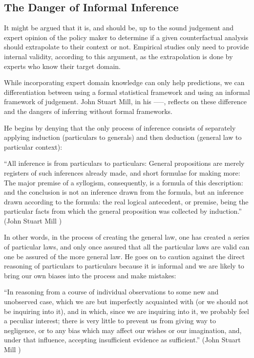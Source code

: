\documentclass[a4paper,12pt]{article}
\begin{document}
\subsection*{The Danger of Informal Inference}

It might be argued that it is, and should be, up to the sound judgement and expert opinion of the policy maker to determine if a given counterfactual analysis should extrapolate to their context or not. Empirical studies only need to provide internal validity, according to this argument, as the extrapolation is done by experts who know their target domain.

While incorporating expert domain knowledge can only help predictions, we can differentiation between using a formal statistical framework and using an informal framework of judgement. John Stuart Mill, in his -----, reflects on these difference and the dangers of inferring without formal frameworks.

He begins by denying that the only process of inference consists of separately applying induction (particulars to generals) and then deduction (general law to particular context):

\begin{displayquote}
  ``All inference is from particulars to particulars: General propositions are merely registers of such inferences already made, and short formulae for making more: The major premise of a syllogism, consequently, is a formula of this description: and the conclusion is not an inference drawn from the formula, but an inference drawn according to the formula: the real logical antecedent, or premise, being the particular facts from which the general proposition was collected by induction.''  (John Stuart Mill  )
\end{displayquote}

In other words, in the process of creating the general law, one has created a series of particular laws, and only once assured that all the particular laws are valid can one be assured of the more general law. He goes on to caution against the direct reasoning of particulars to particulars because it is informal and we are likely to bring our own biases into the process and make mistakes:
%
\begin{displayquote}
``In reasoning from a course of individual observations to some new and unobserved case, which we are but imperfectly acquainted with (or we should not be inquiring into it), and in which, since we are inquiring into it, we probably feel a peculiar interest; there is very little to prevent us from giving way to negligence, or to any bias which may affect our wishes or our imagination, and, under that influence, accepting insufficient evidence as sufficient.'' (John Stuart Mill )
\end{displayquote}
\end{document}
